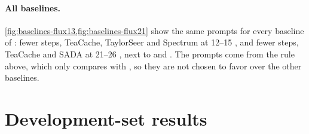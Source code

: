 \begin{figure}[t]
  \centering
  
\end{figure}

\begin{figure}[!t]
  \centering
  
\end{figure}

\paragraph{All baselines.} \cref{fig:baselines-flux13,fig:baselines-flux21} show the same prompts for every baseline of
: fewer steps, TeaCache, TaylorSeer and Spectrum at 12--15 \nfe, and fewer steps, TeaCache and
SADA at 21--26 \nfe, next to \seacache and \ours. The prompts come from the rule above, which only compares \ours with
\seacache, so they are not chosen to favor \ours over the other baselines.

\begin{figure}[t]
  \centering
  
\end{figure}

\begin{figure}[t]
  \centering
  
\end{figure}

\section{Development-set results}
\label{supp:devset}

